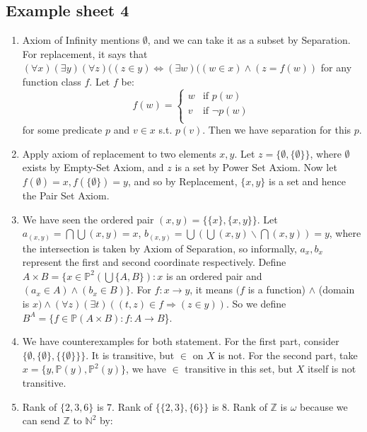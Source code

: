 \subsection{Example sheet 4}
\begin{enumerate}
\item Axiom of Infinity mentions $\emptyset$, and we can take it as a subset by Separation.\\
      For replacement, it says that $(\forall x)(\exists y)(\forall z)((z \in y) \iff (\exists w)((w \in x) \wedge (z=f(w))$ for any function class $f$. Let $f$ be:
      \begin{equation*}
f(w) = \left\{
\begin{array}{ll}
w & \text{if } p(w)\\
v & \text{if } \neg p(w) \\
\end{array} \right.
\end{equation*}
for some predicate $p$ and $v \in x$ s.t. $p(v)$. Then we have separation for this $p$.\\
\item Apply axiom of replacement to two elements $x,y$. Let $z=\{\emptyset,\{\emptyset\}\}$, where $\emptyset$ exists by Empty-Set Axiom, and $z$ is a set by Power Set Axiom. Now let $f(\emptyset)=x, f(\{\emptyset\})=y$, and so by Replacement, $\{x,y\}$ is a set and hence the Pair Set Axiom.\\
\item We have seen the ordered pair $(x,y)=\{\{x\},\{x,y\}\}$. Let $a_{(x,y)}=\bigcap \bigcup (x,y)=x$, $b_{(x,y)}=\bigcup(\bigcup(x,y) \backslash \bigcap (x,y))=y$, where the intersection is taken by Axiom of Separation, so informally, $a_x,b_x$ represent the first and second coordinate respectively. Define $A \times B=\{x \in \mathbb{P}^2(\bigcup\{A,B\}): x$ is an ordered pair and $(a_x \in A) \wedge (b_x \in B)\}$. For $f: x \rightarrow y$, it means $(f$ is a function) $\wedge$ (domain is $x) \wedge (\forall z)(\exists t)((t,z) \in f \Rightarrow (z \in y))$. So we define $B^A=\{f \in \mathbb{P}(A \times B): f: A \rightarrow B$\}.\\
\item We have counterexamples for both statement. For the first part, consider $\{\emptyset,\{\emptyset\},\{\{\emptyset\}\}\}$. It is transitive, but $\in$ on $X$ is not.
    For the second part, take $x=\{y,\mathbb{P}(y),\mathbb{P}^2(y)\}$, we have $\in$ transitive in this set, but $X$ itself is not transitive.\\
\item Rank of $\{2,3,6\}$ is $7$. Rank of $\{\{2,3\},\{6\}\}$ is $8$. Rank of $\mathbb{Z}$ is $\omega$ because we can send $\mathbb{Z}$ to $\mathbb{N}^2$ by:

\end{enumerate}
